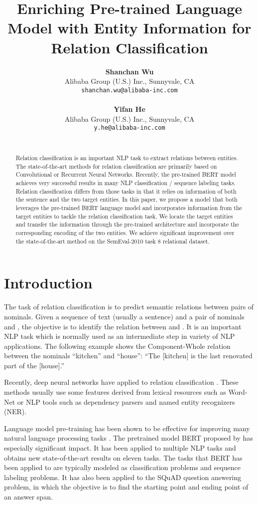 \documentclass[11pt]{article}
\title{
	Enriching Pre-trained Language Model with Entity Information for Relation Classification
}
\author{\textbf{Shanchan Wu} \\
	Alibaba Group (U.S.) Inc., Sunnyvale, CA   \\
{\tt shanchan.wu@alibaba-inc.com} \\ \\
	\textbf{Yifan He} \\
	Alibaba Group (U.S.) Inc., Sunnyvale, CA  \\
{\tt y.he@alibaba-inc.com} \\
	\\
}
\date{}
\providecommand{\cite}[1]{\citeauthoryear{#1}}
\renewcommand{\cite}{\citep}
\begin{document}
\maketitle



\begin{abstract}
Relation classification is an important NLP task
to extract relations between entities. The 
state-of-the-art methods for relation classification are primarily
based on Convolutional or Recurrent Neural Networks. 
Recently, the pre-trained BERT model
achieves very successful results in many NLP classification  / sequence labeling tasks. Relation classification differs from
those tasks in that it relies on information of both the
sentence and the two target entities.
In this
paper, we propose a model that both leverages the pre-trained BERT language model and incorporates information from the target entities to tackle the relation classification task. 
We locate the target entities and transfer the information through the pre-trained architecture
and incorporate the corresponding encoding of the two entities.
We achieve  significant improvement over the state-of-the-art method on the SemEval-2010 task 8 relational dataset. 
\end{abstract}

 

\section{Introduction}

The task of relation classification is to predict semantic relations between pairs of nominals. 
Given a sequence of text (usually a sentence)  and a pair of nominals  and , the objective
is to identify the relation between  and  \cite{Hendrickx2010_semeval}. 
It is an important NLP task which is normally
used as an intermediate step in variety of NLP
applications. 
The following example shows the
Component-Whole relation between the nominals
``kitchen'' and ``house'':  ``The [kitchen] is the last renovated part of the [house].''

Recently, deep neural networks have applied to relation classification 
\cite{Socher_EMNLP_2012,Zeng_coling_2014,Yu_NIPS_Worksho_2014,Nogueira_ACL_2015,Huang_COLING_2016,Joohong_Arxiv_2019}.
These methods usually use  some features
derived from lexical resources such as Word-Net or NLP tools such as dependency parsers and
named entity recognizers (NER).


Language model pre-training has been shown to be effective
for improving many natural language processing
tasks \cite{Dai_NIPS_2015,Peters_arxiv_2017,OpenAI_2018_tech,Ruder_ACL_2018,bert_Jacobv_corr_bert_2018}. 
The pretrained model BERT proposed by \cite{bert_Jacobv_corr_bert_2018} 
has especially significant impact. It has been applied to multiple NLP tasks and obtains new state-of-the-art results on eleven tasks. The tasks that BERT has been applied to are typically modeled as classification problems and sequence labeling problems.  
It has also been applied to the
SQuAD question answering \cite{Rajpurkar_squad_2016} problem, in
which the objective is to find the starting point and ending point of an answer span. 
\end{document}
